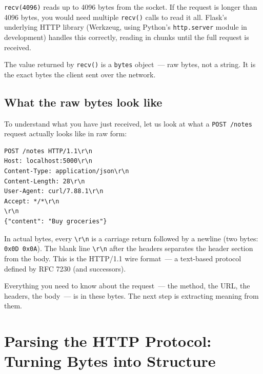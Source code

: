 \noindent{}\texttt{recv(4096)} reads up to 4096 bytes from the socket. If the request is longer than 4096 bytes, you would need multiple \texttt{recv()} calls to read it all. Flask's underlying HTTP library (Werkzeug, using Python's \texttt{http.server} module in development) handles this correctly, reading in chunks until the full request is received.

The value returned by \texttt{recv()} is a \texttt{bytes} object~--- raw bytes, not a string. It is the exact bytes the client sent over the network.

\subsection*{What the raw bytes look like}\label{05-internal-request-execution:what-the-raw-bytes-look-like}

To understand what you have just received, let us look at what a \texttt{POST\ /notes} request actually looks like in raw form:

\begin{outputbox}[short]
\begin{Verbatim}[fontsize=\codesize, breaklines, breakanywhere, breaksymbolleft={\tiny\textcolor{muted}{$\hookrightarrow$}}]
POST /notes HTTP/1.1\r\n
Host: localhost:5000\r\n
Content-Type: application/json\r\n
Content-Length: 28\r\n
User-Agent: curl/7.88.1\r\n
Accept: */*\r\n
\r\n
{"content": "Buy groceries"}
\end{Verbatim}
\end{outputbox}

\noindent{}In actual bytes, every \texttt{\textbackslash{}r\textbackslash{}n} is a carriage return followed by a newline (two bytes: \texttt{0x0D\ 0x0A}). The blank line \texttt{\textbackslash{}r\textbackslash{}n} after the headers separates the header section from the body. This is the HTTP/1.1 wire format~--- a text-based protocol defined by RFC 7230 (and successors).

Everything you need to know about the request~--- the method, the URL, the headers, the body~--- is in these bytes. The next step is extracting meaning from them.

\setcounter{section}{2}
\section{Parsing the HTTP Protocol: Turning Bytes into Structure}\label{05-internal-request-execution:53-parsing-the-http-protocol-turning-bytes-into-structure}

